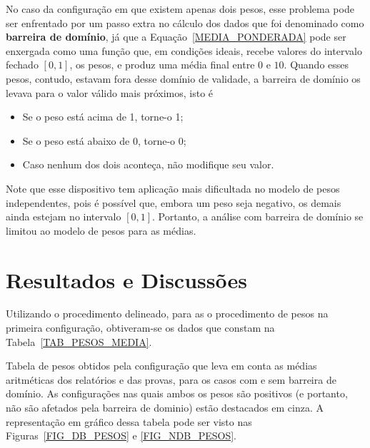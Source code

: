 \documentclass[11pt]{article}
\begin{document}
                No caso da configuração em que existem apenas
                dois pesos, esse problema pode ser enfrentado
                por um passo extra no cálculo dos dados que
                foi denominado como
                \textbf{barreira de domínio},
                já que a Equação~\ref{MEDIA_PONDERADA} pode
                ser enxergada como uma função que, em
                condições ideais, recebe valores do intervalo
                fechado $[0,1]$, os pesos, e produz uma média
                final entre $0$ e $10$. Quando esses pesos,
                contudo, estavam fora desse domínio de
                validade, a barreira de domínio os levava
                para o valor válido mais próximos, isto é
                \begin{itemize}
                        \item Se o peso está acima de 1,
                              torne-o 1;
                        \item Se o peso está abaixo de 0,
                              torne-o 0;
                        \item Caso nenhum dos dois aconteça,
                              não modifique seu valor.
                \end{itemize}

                Note que esse dispositivo tem aplicação mais
                dificultada no modelo de pesos independentes,
                pois é possível que, embora um peso seja
                negativo, os demais ainda estejam no intervalo
                $[0,1]$. Portanto, a análise com barreira de
                domínio se limitou ao modelo de pesos para as
                médias.

        \section{Resultados e Discussões}
                Utilizando o procedimento delineado, para as
                o procedimento de pesos na primeira
                configuração, obtiveram-se os dados que constam
                na Tabela~\ref{TAB_PESOS_MEDIA}.

                \begin{table}[!htp]
                        \centering
                        
                        \caption{\small
                        Tabela de pesos obtidos pela
                        configuração que leva em conta as
                        médias aritméticas dos relatórios e
                        das provas, para os casos com e sem
                        barreira de domínio. As configurações
                        nas quais ambos os pesos são positivos
                        (e portanto, não são afetados pela
                        barreira de dominio) estão destacados
                        em cinza. A representação em gráfico
                        dessa tabela pode ser visto nas
                        Figuras~\ref{FIG_DB_PESOS} e
                        \ref{FIG_NDB_PESOS}.}
                        \label{TAB_PESOS_MEDIA}
                \end{table}
\end{document}
